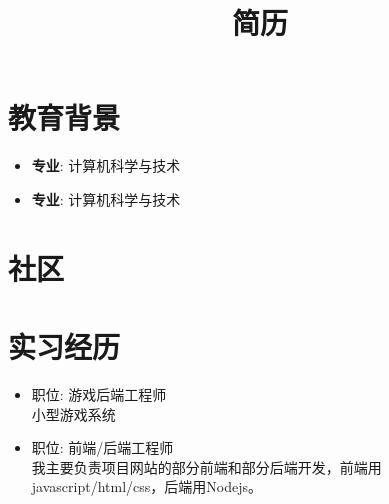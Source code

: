 \documentclass[11pt,a4paper]{moderncv}
\title{简历}               %
\begin{document}
\maketitle

\section{教育背景}
{
\begin{itemize}
\item \textbf{专业}: 计算机科学与技术
\end{itemize}
}


{
\begin{itemize}
\item \textbf{专业}: 计算机科学与技术
\end{itemize}
}




\section{社区}


\section{实习经历}
{
\begin{itemize}
\item 职位: 游戏后端工程师\\
小型游戏系统
\end{itemize}
}

{
\begin{itemize}
\item 职位: 前端/后端工程师\\
我主要负责项目网站的部分前端和部分后端开发，前端用javascript/html/css，后端用Nodejs。
\end{itemize}
}
\end{document}
